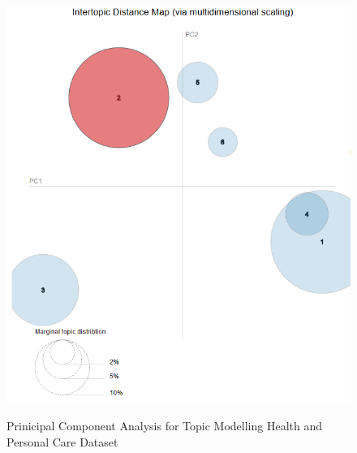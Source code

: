 

\begin{figure}[H]
  {\includegraphics[width = 0.85 \textwidth]{img/lda/2.PNG}}
  \caption{Prinicipal Component Analysis for Topic Modelling Health and Personal Care Dataset}
\end{figure}


